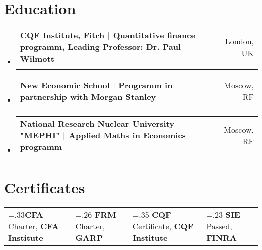 \documentclass[letterpaper,hidelinks]{article}
\makeatletter
\newcommand{\resumeSubheading}[4]{
  \vspace{-2pt}\item
    \begin{tabular*}{0.97\textwidth}[t]{l@{\extracolsep{\fill}}r}
      \textbf{#1} & #2 \\
      \text{\small#3} & \text{\small #4} \\
    \end{tabular*}\vspace{-7pt}
}
\newcommand{\resumeSubHeadingListStart}{\begin{itemize}[leftmargin=0.1in, label={}]}
\newcommand{\resumeSubHeadingListEnd}{\end{itemize}}
\makeatother
\begin{document}
\vspace{-10pt}
\section{Education}
\vspace{1pt}
\resumeSubHeadingListStart
\resumeSubheading
{{CQF Institute, Fitch | Quantitative finance programm, Leading Professor: Dr. Paul Wilmott}}{London, UK\vspace{-2pt}}
{Quantitative Finance Charter}{Jan 2022 \textbf{--} Jul 2022\vspace{4pt}}
\resumeSubheading
{{New Economic School | Programm in partnership with Morgan Stanley}}{Moscow, RF\vspace{-2pt}}
{Masters in Finance}{Sep 2013 \textbf{--} Jul 2015\vspace{4pt}}
\resumeSubheading
{{National Research Nuclear University "MEPHI" | Applied Maths in Economics programm}}{Moscow, RF\vspace{-2pt}}
{Economist Mathematician}{Sep 2007 \textbf{--} Jul 2012}
\resumeSubHeadingListEnd

\vspace{-4pt}
\section{Certificates}
\resumeSubHeadingListStart
\small{\item{
  \begin{tabularx}{0.96\textwidth} { 
     >{\centering\arraybackslash\hsize=.33\hsize}X 
    || >{\centering\arraybackslash\hsize=.26\hsize}X 
    || >{\centering\arraybackslash\hsize=.35\hsize}X  
    || >{\centering\arraybackslash\hsize=.23\hsize}X } 
    \textbf{CFA} Charter, \textbf{CFA Institute} & 
    \textbf{FRM} Charter, \textbf{GARP} & 
    \textbf{CQF} Certificate, \textbf{CQF Institute} & 
    \textbf{SIE} Passed, \textbf{FINRA}
  \end{tabularx}
}}
\resumeSubHeadingListEnd
\end{document}
